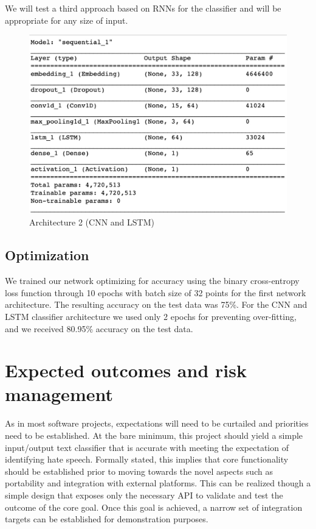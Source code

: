 \documentclass[conference]{sig-alternate-05-2015}
\begin{document}
We will test a third approach based on RNNs for the classifier and will be appropriate for any size of input.
\begin{figure}
	\centering
	\includegraphics[width=0.8\linewidth]{"Model_CNN_LSTM"}
	\caption{Architecture 2 (CNN and LSTM)}
	\label{fig:model CNN LSTM}
\end{figure}

\subsection{Optimization}
We trained our network optimizing for accuracy using the binary cross-entropy loss function through 10 epochs with batch size of 32 points for the first network architecture. The resulting accuracy on the test data was 75\%. For the CNN and LSTM classifier architecture we used only 2 epochs for preventing over-fitting, and we received 80.95\% accuracy on the test data.


\section{Expected outcomes and risk management}

As in most software projects, expectations will need to be curtailed and priorities need to be established.  At the bare minimum, this project should yield a simple input/output text classifier that is accurate with meeting the expectation of identifying hate speech.  Formally stated, this implies that core functionality should be established prior to moving towards the novel aspects such as portability and integration with external platforms.  This can be realized though a simple design that exposes only the necessary API to validate and test the outcome of the core goal.  Once this goal is achieved, a narrow set of integration targets can be established for demonstration purposes.
\end{document}

